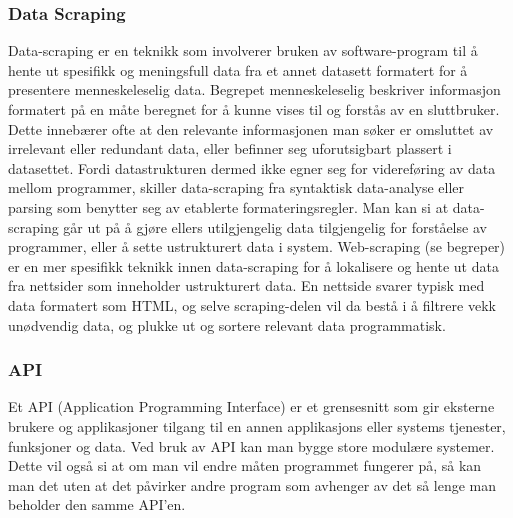 \documentclass[../main.tex]{subfiles}
\begin{document}
\subsubsection{Data Scraping}
Data-scraping er en teknikk som involverer bruken av software-program til å hente ut spesifikk og meningsfull data fra et annet datasett formatert for å presentere menneskeleselig data.  \newline Begrepet menneskeleselig beskriver informasjon formatert på en måte beregnet for å kunne vises til og forstås av en sluttbruker. Dette innebærer ofte at den relevante informasjonen man søker er omsluttet av irrelevant eller redundant data, eller befinner seg uforutsigbart plassert i datasettet. Fordi datastrukturen dermed ikke egner seg for videreføring av data mellom programmer, skiller data-scraping fra syntaktisk  data-analyse eller parsing som benytter seg av etablerte formateringsregler. Man kan si at data-scraping går ut på å gjøre ellers utilgjengelig data tilgjengelig for forståelse av programmer, eller å sette ustrukturert data i system.\newline
\newline
Web-scraping (se begreper) er en mer spesifikk teknikk innen data-scraping for å lokalisere og hente ut data fra nettsider som inneholder ustrukturert data. En nettside svarer typisk med data formatert som HTML, og selve scraping-delen vil da bestå i å filtrere vekk unødvendig data, og plukke ut og sortere relevant data programmatisk. 

\subsubsection{API}

Et API (Application Programming Interface) er et grensesnitt som gir eksterne brukere og applikasjoner tilgang til en annen applikasjons eller systems tjenester, funksjoner og data. Ved bruk av API kan man bygge store modulære systemer. Dette vil også si at om man vil endre måten programmet fungerer på, så kan man det uten at det påvirker andre program som avhenger av det så lenge man beholder den samme API’en. 
\end{document}
